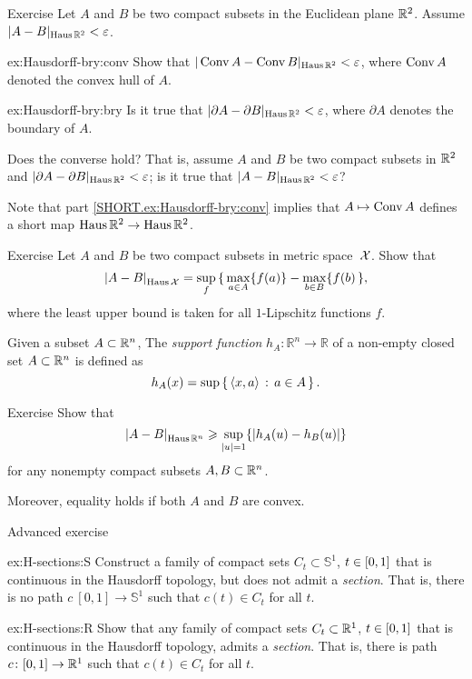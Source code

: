 \begin{thm}{Exercise}\label{ex:Hausdorff-bry}
Let $A$ and $B$ be two compact subsets in the Euclidean plane $\mathbb{R}^2$.
Assume $|A-B|_{\operatorname{\rm Haus}\nolimits\mathbb{R}^2}<\varepsilon$.

\begin{subthm}{ex:Hausdorff-bry:conv}
Show that $|\mathop{\rm Conv}\nolimits A-\mathop{\rm Conv}\nolimits B|_{\operatorname{\rm Haus}\nolimits\mathbb{R}^2}<\varepsilon$, where $\mathop{\rm Conv}\nolimits A$ denoted the convex hull of $A$.
\end{subthm}
\begin{subthm}{ex:Hausdorff-bry:bry}
Is it true that
$|\partial A-\partial B|_{\operatorname{\rm Haus}\nolimits\mathbb{R}^2}<\varepsilon$,
where $\partial A$ denotes the boundary of $A$.

Does the converse hold? That is, assume $A$ and $B$ be two compact subsets in $\mathbb{R}^2$
and $|\partial A-\partial B|_{\operatorname{\rm Haus}\nolimits\mathbb{R}^2}<\varepsilon$; 
is it true that $|A-B|_{\Haus\RR^2}\z<\eps$?
\end{subthm}

\end{thm}

Note that part \ref{SHORT.ex:Hausdorff-bry:conv} implies that $A\mapsto \mathop{\rm Conv}\nolimits A$ defines a short map $\operatorname{\rm Haus}\nolimits\mathbb{R}^2\to \operatorname{\rm Haus}\nolimits\mathbb{R}^2$. 

\begin{thm}{Exercise}\label{ex:Haus-func}
Let $A$ and $B$ be two compact subsets in metric space~$\mathcal{X}$.
Show that 
\[\dist{A}{B}{\Haus\spc{X}}=\sup_f\, \{\,\max_{a\in A}\{f(a)\}-\max_{b\in B}\{f(b)\,\},\]
where the least upper bound is taken for all $1$-Lipschitz functions $f$.

\end{thm}

Given a subset $A\subset \mathbb{R}^n$,
The \emph{support function} $h_A\colon\mathbb{R}^n\to\mathbb{R}$ of a  non-empty closed set $A\subset \mathbb{R}^n$ is defined as 
\[h_A(x)=\sup\left\{\,{\langle x, a\rangle}\,:\,{a\in A}\,\right\}.\]

\begin{thm}{Exercise}\label{ex:Haus-support}
Show that 
\[\dist{A}{B}{\Haus\RR^n}\ge \sup_{|u|=1}\{|h_A(u)-h_B(u)|\}\]
for any nonempty compact subsets $A,B\subset \mathbb{R}^n$.

Moreover, equality holds if both $A$ and $B$ are convex.
\end{thm}


\begin{thm}{Advanced exercise}\label{ex:H-sections}
\begin{subthm}{ex:H-sections:S}
Construct a family of compact sets $C_t\subset\mathbb{S}^1$, $t\z\in [0,1]$ that is continuous in the Hausdorff topology, 
but does not admit a {}\emph{section}.
That is, there is no path $c\:[0,1]\to \mathbb{S}^1$ such that $c(t)\in C_t$ for all $t$.
\end{subthm}

\begin{subthm}{ex:H-sections:R}
Show that any family of compact sets $C_t\subset\mathbb{R}^1$, $t\z\in [0,1]$ that is continuous in the Hausdorff topology, 
admits a {}\emph{section}.
That is, there is path $c\colon[0,1]\to \mathbb{R}^1$ such that $c(t)\in C_t$ for all $t$.
\end{subthm}

\end{thm}

